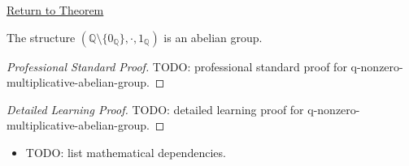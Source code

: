 \newpage
{}
\label{prf:q-nonzero-multiplicative-abelian-group}

\begin{remark*}[Return]
\hyperref[thm:q-nonzero-multiplicative-abelian-group]{Return to Theorem}
\end{remark*}

\begin{theorem*}
The structure
$(\mathbb{Q}\setminus\{0_{\mathbb{Q}}\},\cdot,1_{\mathbb{Q}})$ is an abelian
group.
\end{theorem*}

\begin{proof}[Professional Standard Proof]
\LRAProofBodyStart
TODO: professional standard proof for q-nonzero-multiplicative-abelian-group.
\end{proof}

\begin{proof}[Detailed Learning Proof]
\LRAProofBodyStart
TODO: detailed learning proof for q-nonzero-multiplicative-abelian-group.
\end{proof}

\begin{remark*}
\end{remark*}

\begin{dependencies}
\begin{itemize}
  \item TODO: list mathematical dependencies.
\end{itemize}
\end{dependencies}

\clearpage

